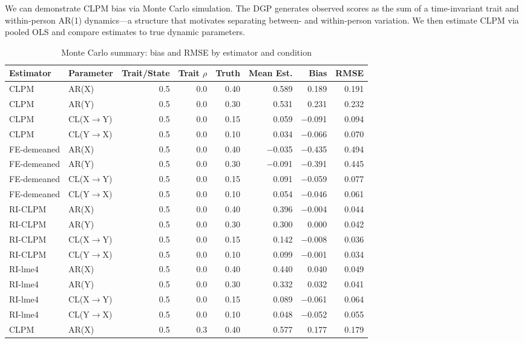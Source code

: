 \documentclass[12pt]{article}
\begin{document}
We can demonstrate CLPM bias via Monte Carlo simulation. The DGP generates observed scores as the sum of a time-invariant trait and within-person AR(1) dynamics---a structure that motivates separating between- and within-person variation. We then estimate CLPM via pooled OLS and compare estimates to true dynamic parameters.


\begin{table}[H]
\caption{Monte Carlo summary: bias and RMSE by estimator and condition}
\centering
\begin{tabular}[t]{llrrrrrr}
\toprule
Estimator & Parameter & Trait/State & Trait $\rho$ & Truth & Mean Est. & Bias & RMSE\\
\midrule
CLPM & AR(X) & 0.5 & 0.0 & 0.40 & 0.589 & 0.189 & 0.191\\
CLPM & AR(Y) & 0.5 & 0.0 & 0.30 & 0.531 & 0.231 & 0.232\\
CLPM & CL(X$\rightarrow$Y) & 0.5 & 0.0 & 0.15 & 0.059 & $-$0.091 & 0.094\\
CLPM & CL(Y$\rightarrow$X) & 0.5 & 0.0 & 0.10 & 0.034 & $-$0.066 & 0.070\\
FE-demeaned & AR(X) & 0.5 & 0.0 & 0.40 & $-$0.035 & $-$0.435 & 0.494\\
\addlinespace
FE-demeaned & AR(Y) & 0.5 & 0.0 & 0.30 & $-$0.091 & $-$0.391 & 0.445\\
FE-demeaned & CL(X$\rightarrow$Y) & 0.5 & 0.0 & 0.15 & 0.091 & $-$0.059 & 0.077\\
FE-demeaned & CL(Y$\rightarrow$X) & 0.5 & 0.0 & 0.10 & 0.054 & $-$0.046 & 0.061\\
RI-CLPM & AR(X) & 0.5 & 0.0 & 0.40 & 0.396 & $-$0.004 & 0.044\\
RI-CLPM & AR(Y) & 0.5 & 0.0 & 0.30 & 0.300 & 0.000 & 0.042\\
\addlinespace
RI-CLPM & CL(X$\rightarrow$Y) & 0.5 & 0.0 & 0.15 & 0.142 & $-$0.008 & 0.036\\
RI-CLPM & CL(Y$\rightarrow$X) & 0.5 & 0.0 & 0.10 & 0.099 & $-$0.001 & 0.034\\
RI-lme4 & AR(X) & 0.5 & 0.0 & 0.40 & 0.440 & 0.040 & 0.049\\
RI-lme4 & AR(Y) & 0.5 & 0.0 & 0.30 & 0.332 & 0.032 & 0.041\\
RI-lme4 & CL(X$\rightarrow$Y) & 0.5 & 0.0 & 0.15 & 0.089 & $-$0.061 & 0.064\\
\addlinespace
RI-lme4 & CL(Y$\rightarrow$X) & 0.5 & 0.0 & 0.10 & 0.048 & $-$0.052 & 0.055\\
CLPM & AR(X) & 0.5 & 0.3 & 0.40 & 0.577 & 0.177 & 0.179\\

\end{tabular}
\end{table}
\end{document}
